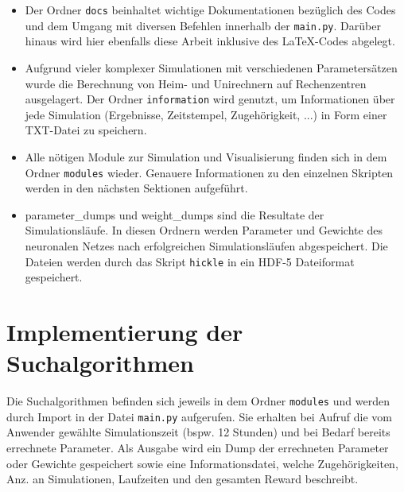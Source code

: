 	\begin{minipage}{0.65\textwidth}
		\begin{itemize}
			\item Der Ordner \texttt{docs} beinhaltet wichtige Dokumentationen bezüglich des Codes und dem Umgang mit diversen Befehlen innerhalb der \texttt{main.py}. Darüber hinaus wird hier ebenfalls diese Arbeit inklusive des \LaTeX-Codes abgelegt.
			\item Aufgrund vieler komplexer Simulationen mit verschiedenen Parametersätzen wurde die Berechnung von Heim- und Unirechnern auf Rechenzentren ausgelagert. Der Ordner \texttt{information} wird genutzt, um Informationen über jede Simulation (Ergebnisse, Zeitstempel, Zugehörigkeit, ...) in Form einer TXT-Datei zu speichern.
			\item Alle nötigen Module zur Simulation und Visualisierung finden sich in dem Ordner \texttt{modules} wieder. Genauere Informationen zu den einzelnen Skripten werden in den nächsten Sektionen aufgeführt.
			\item parameter\_dumps und weight\_dumps sind die Resultate der Simulationsläufe. In diesen Ordnern werden Parameter und Gewichte des neuronalen Netzes nach erfolgreichen Simulationsläufen abgespeichert. Die Dateien werden durch das Skript \texttt{hickle} in ein HDF-5 Dateiformat \cite{hdf5} gespeichert.
		\end{itemize}		
	\end{minipage}
	
	
		
\section{Implementierung der Suchalgorithmen}
\label{sec:imp_search}
	Die Suchalgorithmen befinden sich jeweils in dem Ordner \texttt{modules} und werden durch Import in der Datei \texttt{main.py} aufgerufen. Sie erhalten bei Aufruf die vom Anwender gewählte Simulationszeit (bspw. 12 Stunden) und bei Bedarf bereits errechnete Parameter. Als Ausgabe wird ein Dump der errechneten Parameter oder Gewichte gespeichert sowie eine Informationsdatei, welche Zugehörigkeiten, Anz. an Simulationen, Laufzeiten und den gesamten Reward beschreibt. 
	
